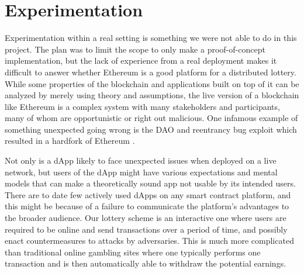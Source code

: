\section{Experimentation}
\label{sec:experimentation}

Experimentation within a real setting is something we were not able to do in this project. The plan was to limit the scope to only make a proof-of-concept implementation, but the lack of experience from a real deployment makes it difficult to answer whether Ethereum is a good platform for a distributed lottery. While some properties of the blockchain and applications built on top of it can be analyzed by merely using theory and assumptions, the live version of a blockchain like Ethereum is a complex system with many stakeholders and participants, many of whom are opportunistic or right out malicious. One infamous example of something unexpected going wrong is the DAO and reentrancy bug exploit which resulted in a hardfork of Ethereum \cite{dhillon_dao_2017}. 

Not only is a dApp likely to face unexpected issues when deployed on a live network, but users of the dApp might have various expectations and mental models that can make a theoretically sound app not usable by its intended users. There are to date few actively used dApps on any smart contract platform, and this might be because of a failure to communicate the platform's advantages to the broader audience. Our lottery scheme is an interactive one where users are required to be online and send transactions over a period of time, and possibly enact countermeasures to attacks by adversaries. This is much more complicated than traditional online gambling sites where one typically performs one transaction and is then automatically able to withdraw the potential earnings. 
